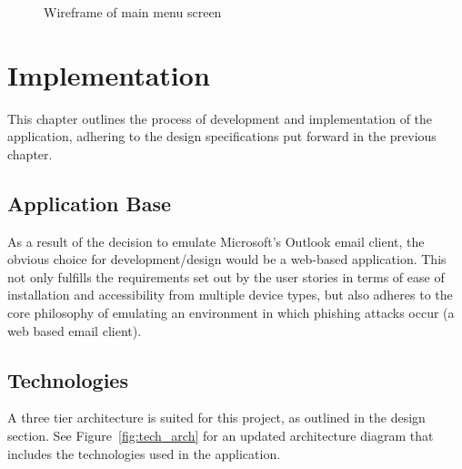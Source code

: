 \documentclass{l4proj}
\begin{document}
\begin{figure}[H]
    \centering
    \caption{Wireframe of main menu screen}
    \label{fig:menu_wf} 
\end{figure}

\chapter{Implementation}

This chapter outlines the process of development and implementation of the application, adhering to the design specifications put forward in the previous chapter.

\section{Application Base}
As a result of the decision to emulate Microsoft's Outlook email client, the obvious choice for development/design would be a web-based application. This not only fulfills the requirements set out by the user stories in terms of ease of installation and accessibility from multiple device types, but also adheres to the core philosophy of emulating an environment in which phishing attacks occur (a web based email client).

\section{Technologies}
 A three tier architecture is suited for this project, as outlined in the design section. See Figure~\ref{fig:tech_arch} for an updated architecture diagram that includes the technologies used in the application.
\end{document}
